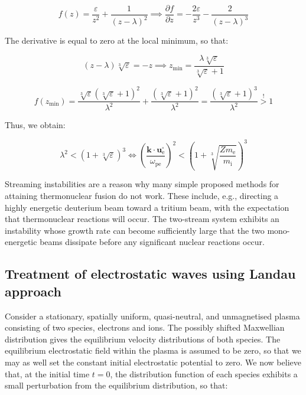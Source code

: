 \begin{equation}
    f(z)=\frac{\varepsilon}{z^2}+\frac{1}{(z-\lambda)^2}\implies\frac{\partial f}{\partial z}=-\frac{2\varepsilon}{z^3}-\frac{2}{(z-\lambda)^3}
\end{equation}

The derivative is equal to zero at the local minimum, so that:

\begin{equation}
    (z-\lambda)\sqrt[3]{\varepsilon}=-z\implies z_\text{min}=\frac{\lambda\sqrt[3]{\varepsilon}}{\sqrt[3]{\varepsilon}+1}
\end{equation}

\begin{equation}
    f(z_\text{min})=\frac{\sqrt[3]{\varepsilon}(\sqrt[3]{\varepsilon}+1)^2}{\lambda^2}+\frac{(\sqrt[3]{\varepsilon}+1)^2}{\lambda^2}=\frac{(\sqrt[3]{\varepsilon}+1)^3}{\lambda^2}\stackrel{!}{>}1
\end{equation}

Thus, we obtain:

\begin{equation}
    \lambda^2<\left(1+\sqrt[3]{\varepsilon}\right)^3\Longleftrightarrow\left(\frac{\mathbf{k}\cdot\mathbf{u}_\text{e}^\square}{\omega_\text{pe}}\right)^2<\left(1+\sqrt[3]{\frac{Zm_\text{e}}{m_\mathrm{i}}}\right)^3
\end{equation}

Streaming instabilities are a reason why many simple proposed methods for attaining thermonuclear fusion do not work. These include, e.g., directing a highly energetic deuterium beam toward a tritium beam, with the expectation that thermonuclear reactions will occur. The two-stream system exhibits an instability whose growth rate can become sufficiently large that the two mono-energetic beams dissipate before any significant nuclear reactions occur.

\subsection{Treatment of electrostatic waves using Landau approach}

Consider a stationary, spatially uniform, quasi-neutral, and unmagnetised plasma consisting of two species, electrons and ions. The possibly shifted Maxwellian distribution gives the equilibrium velocity distributions of both species. The equilibrium electrostatic field within the plasma is assumed to be zero, so that we may as well set the constant initial electrostatic potential to zero. We now believe that, at the initial time $t=0$, the distribution function of each species exhibits a small perturbation from the equilibrium distribution, so that:

